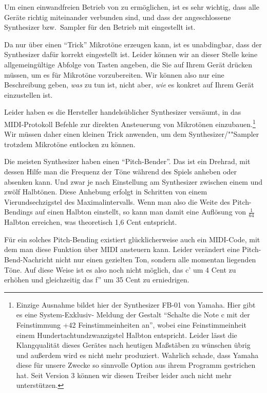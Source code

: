 Um einen einwandfreien Betrieb von \mutabor{} zu ermöglichen, ist es
sehr wichtig, dass alle Geräte richtig miteinander verbunden sind, und
dass der angeschlossene Synthesizer bzw.\ Sampler für den Betrieb mit
\mutabor{} eingestellt ist.

Da \mutabor{} nur über einen "`Trick"' 
Mikrotöne erzeugen kann, ist es unabdingbar, dass der Synthesizer dafür
korrekt eingestellt ist. Leider können wir an dieser Stelle keine
allgemeingültige Abfolge von Tasten angeben, die Sie auf Ihrem Gerät
drücken müssen, um es für Mikrotöne vorzubereiten. Wir können also nur
eine Beschreibung geben, \emph{was} zu tun ist, nicht aber, \emph{wie}
es konkret auf Ihrem Gerät einzustellen ist. 


Leider haben es die Hersteller handelsüblicher Synthesizer versäumt,
in das MIDI-Protokoll Befehle zur direkten Ansteuerung von Mikrotönen
einzubauen.\footnote{Einzige Ausnahme bildet hier der
Synthesizer FB-01 von Yamaha. Hier gibt es eine System-Exklusiv-
Meldung der Gestalt "`Schalte die Note c mit der Feinstimmung +42
Feinstimmeinheiten an"', wobei eine Feinstimmeinheit einem
Hundertachtundzwanzigstel Halbton entspricht. Leider lässt die
Klangqualität dieses Gerätes nach heutigen Maßstäben zu wünschen übrig
und außerdem wird es nicht mehr produziert. Wahrlich schade, dass
Yamaha diese für unsere Zwecke so sinnvolle Option aus ihrem Programm
gestrichen hat. \iffalse
Trotzdem haben wir einen speziellen Treiber für dieses
Gerät geschrieben, denn es erreicht von allen uns bekannten
Synthesizern noch immer die beste Intonationsgenauigkeit.
\fi
Seit Version 3 können wir diesen Treiber leider auch nicht mehr unterstützen.} Wir müssen
daher einen kleinen Trick anwenden, um dem Synthesizer/""Sampler
trotzdem Mikrotöne entlocken zu können.

Die meisten Synthesizer haben einen "`Pitch-Bender"'. Das ist ein
Drehrad, mit dessen Hilfe man die Frequenz der Töne während des Spiels
anheben oder absenken kann. Und zwar je nach Einstellung am
Synthesizer zwischen einem und zwölf Halbtönen. Diese Anhebung erfolgt
in Schritten von einem Vierundsechzigstel des Maximalintervalls. Wenn
man also die Weite des Pitch-Bendings auf einen Halbton einstellt, so
kann man damit eine Auflösung von $\frac{1}{64}$ Halbton erreichen, was
theoretisch 1,6 Cent entspricht.

Für ein solches Pitch-Bending existiert glücklicherweise auch ein
MIDI-Code, mit dem man diese Funktion über MIDI ansteuern kann. Leider
verändert eine Pitch-Bend-Nachricht nicht nur einen gezielten Ton,
sondern alle momentan liegenden Töne. Auf diese Weise ist es also noch
nicht möglich, das c' um 4 Cent zu erhöhen und gleichzeitig das f'' um
35 Cent zu erniedrigen.

